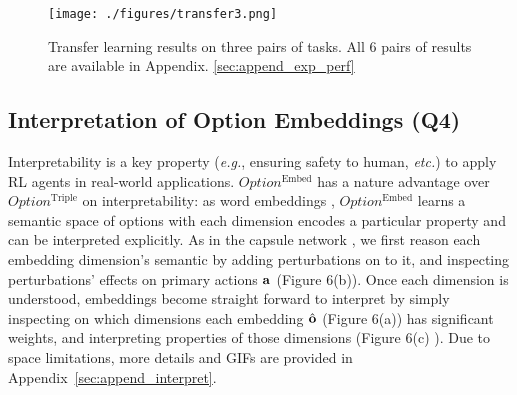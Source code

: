 \documentclass[10pt,journal,compsoc]{IEEEtran}
\newcommand{\linkblue}[1]{\textcolor[HTML]{2E649E}{#1}}
\renewcommand{\cite}{\citep}
\begin{document}
\begin{figure}[h]
 \centering
  \texttt{[image: ./figures/transfer3.png]}\\
  \caption{\small\label{fig:transfer} Transfer learning
    results on three pairs of tasks. All 6 pairs of results are available in Appendix.
    \ref{sec:append_exp_perf}}
\end{figure}

\subsection{Interpretation of Option Embeddings (Q4)}
\label{sec:interpret}
Interpretability is a key property (\textit{e.g.}, ensuring safety to
human, \textit{etc.}) to apply RL agents in
real-world applications. $Option^{\textrm{Embed}}$ has a nature advantage
over $Option^{\textrm{Triple}}$ on interpretability: as word embeddings
\cite{vaswani2017attention}, $Option^{\textrm{Embed}}$ learns a semantic
space of options with each dimension encodes a particular
property and can be interpreted explicitly. As in the capsule
network \cite{sabour2017dynamic}, we first reason each embedding
dimension's semantic by adding perturbations on to it, and
inspecting perturbations' effects on primary actions ${\mathbf{a}}$
(Figure \linkblue{6(b)}). Once each dimension is
understood, embeddings become straight forward to interpret by
simply inspecting on which dimensions each embedding $\hat{{\mathbf{o}}}$
(Figure \linkblue{6(a)}) has significant weights, and
interpreting properties of those dimensions
(Figure \linkblue{6(c)} ). Due to space limitations,
more details and GIFs are provided in
Appendix~\ref{sec:append_interpret}.
\begin{center}
\end{center}
\end{document}
